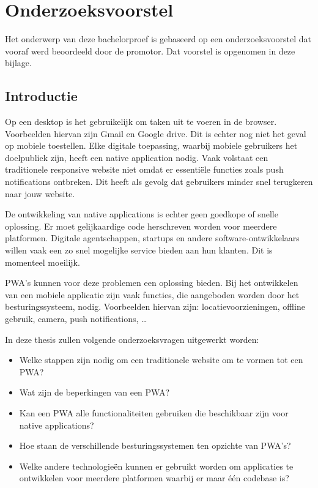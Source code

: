 \chapter{Onderzoeksvoorstel}
Het onderwerp van deze bachelorproef is gebaseerd op een onderzoeksvoorstel dat vooraf werd beoordeeld door de promotor. Dat voorstel is opgenomen in deze bijlage.

\section{Introductie} %
\label{sec:introductie}

Op een desktop is het gebruikelijk om taken uit te voeren in de browser. Voorbeelden hiervan zijn Gmail en Google drive. Dit is echter nog niet het geval op mobiele toestellen.
Elke digitale toepassing, waarbij mobiele gebruikers het doelpubliek zijn, heeft een native application nodig. Vaak volstaat een traditionele responsive website niet omdat er essentiële functies zoals push notifications ontbreken. Dit heeft als gevolg dat gebruikers minder snel terugkeren naar jouw website.
\autocite{Hiltunen2018}

De ontwikkeling van native applications is echter geen goedkope of snelle oplossing. Er moet gelijkaardige code herschreven worden voor meerdere platformen. Digitale agentschappen, startups en andere software-ontwikkelaars willen vaak een zo snel mogelijke service bieden aan hun klanten. Dit is momenteel moeilijk.

PWA's kunnen voor deze problemen een oplossing bieden.
Bij het ontwikkelen van een mobiele applicatie zijn vaak functies, die aangeboden worden door het besturingssysteem, nodig. Voorbeelden hiervan zijn: locatievoorzieningen, offline gebruik, camera, push notifications, …

In deze thesis zullen volgende onderzoeksvragen uitgewerkt worden:
\begin{itemize}
    \item Welke stappen zijn nodig om een traditionele website om te vormen tot een PWA?
    \item Wat zijn de beperkingen van een PWA?
    \item Kan een PWA alle functionaliteiten gebruiken die beschikbaar zijn voor native applications?
    \item Hoe staan de verschillende besturingssystemen ten opzichte van PWA's?
    \item Welke andere technologieën kunnen er gebruikt worden om applicaties te ontwikkelen voor meerdere platformen waarbij er maar één codebase is?
\end{itemize}

